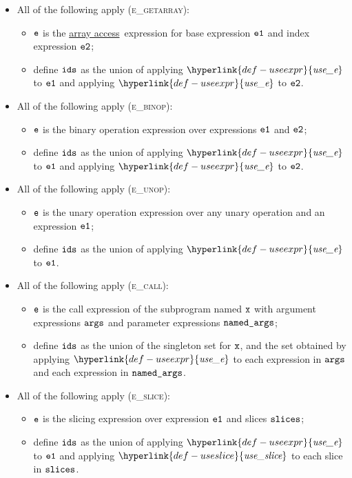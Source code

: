 \documentclass{book}
\newcommand\useexpr[0]{\hyperlink{def-useexpr}{\textfunc{use\_e}}}
\newcommand\useslice[0]{\hyperlink{def-useslice}{\textfunc{use\_slice}}}
\newcommand\arrayaccess[0]{\hyperlink{def-arrayaccess}{array access}}
\begin{document}
\begin{itemize}
  \item All of the following apply (\textsc{e\_getarray}):
  \begin{itemize}
    \item $\texttt{e}$ is the \arrayaccess\ expression for base expression $\texttt{e1}$ and index expression $\texttt{e2}$;
    \item define $\texttt{ids}$ as the union of applying $\useexpr$ to $\texttt{e1}$ and applying $\useexpr$ to $\texttt{e2}$.
  \end{itemize}

  \item All of the following apply (\textsc{e\_binop}):
  \begin{itemize}
    \item $\texttt{e}$ is the binary operation expression over expressions $\texttt{e1}$ and $\texttt{e2}$;
    \item define $\texttt{ids}$ as the union of applying $\useexpr$ to $\texttt{e1}$ and applying $\useexpr$ to $\texttt{e2}$.
  \end{itemize}

  \item All of the following apply (\textsc{e\_unop}):
  \begin{itemize}
    \item $\texttt{e}$ is the unary operation expression over any unary operation and an expression $\texttt{e1}$;
    \item define $\texttt{ids}$ as the union of applying $\useexpr$ to $\texttt{e1}$.
  \end{itemize}

  \item All of the following apply (\textsc{e\_call}):
  \begin{itemize}
    \item $\texttt{e}$ is the call expression of the subprogram named $\texttt{x}$ with argument expressions $\texttt{args}$ and parameter expressions $\texttt{named\_args}$;
    \item define $\texttt{ids}$ as the union of the singleton set for $\texttt{x}$, and the set obtained by applying $\useexpr$ to each expression in
          $\texttt{args}$ and each expression in $\texttt{named\_args}$.
  \end{itemize}

  \item All of the following apply (\textsc{e\_slice}):
  \begin{itemize}
    \item $\texttt{e}$ is the slicing expression over expression $\texttt{e1}$ and slices $\texttt{slices}$;
    \item define $\texttt{ids}$ as the union of applying $\useexpr$ to $\texttt{e1}$ and applying $\useslice$ to each slice in $\texttt{slices}$.
  \end{itemize}


\end{itemize}
\end{document}
